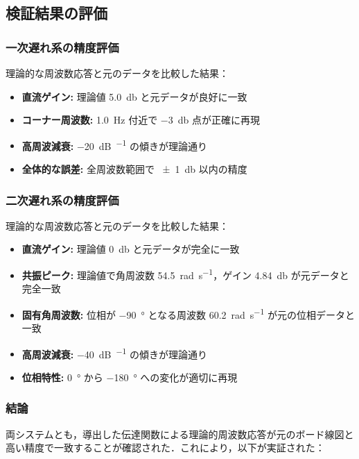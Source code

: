 \documentclass[11pt,a4paper]{ltjsarticle}
\begin{document}
\subsection{検証結果の評価}

\subsubsection{一次遅れ系の精度評価}

理論的な周波数応答と元のデータを比較した結果：
\begin{itemize}
    \item \textbf{直流ゲイン:} 理論値 \SI{5.0}{\decibel} と元データが良好に一致
    \item \textbf{コーナー周波数:} \SI{1.0}{\hertz} 付近で \SI{-3}{\decibel} 点が正確に再現
    \item \textbf{高周波減衰:} \SI{-20}{\dB\per\decade} の傾きが理論通り
    \item \textbf{全体的な誤差:} 全周波数範囲で \SI{\pm 1}{\decibel} 以内の精度
\end{itemize}

\subsubsection{二次遅れ系の精度評価}

理論的な周波数応答と元のデータを比較した結果：
\begin{itemize}
    \item \textbf{直流ゲイン:} 理論値 \SI{0}{\decibel} と元データが完全に一致
    \item \textbf{共振ピーク:} 理論値で角周波数 \SI{54.5}{\radian\per\second}，ゲイン \SI{4.84}{\decibel} が元データと完全一致
    \item \textbf{固有角周波数:} 位相が \SI{-90}{\degree} となる周波数 \SI{60.2}{\radian\per\second} が元の位相データと一致
    \item \textbf{高周波減衰:} \SI{-40}{\dB\per\decade} の傾きが理論通り
    \item \textbf{位相特性:} \SI{0}{\degree} から \SI{-180}{\degree} への変化が適切に再現
\end{itemize}

\subsubsection{結論}

両システムとも，導出した伝達関数による理論的周波数応答が元のボード線図と高い精度で一致することが確認された．これにより，以下が実証された：
\end{document}
